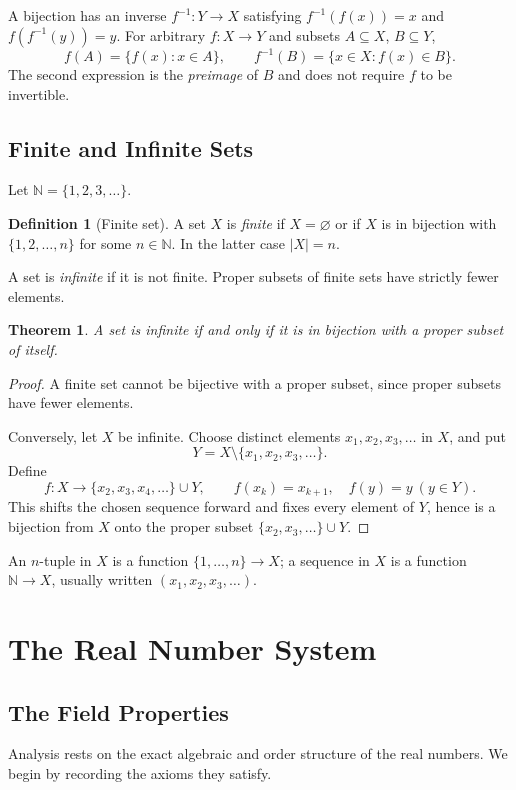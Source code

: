 \documentclass{article}
\theoremstyle{definition}
\newtheorem{definition}{Definition}[section]
\theoremstyle{plain}
\newtheorem{theorem}{Theorem}[section]
\begin{document}
A bijection has an inverse $f^{-1}:Y\to X$ satisfying $f^{-1}(f(x))=x$ and $f(f^{-1}(y))=y$.  For arbitrary $f:X\to Y$ and subsets $A\subseteq X$, $B\subseteq Y$,
\[
	f(A)=\{f(x):x\in A\},
	\qquad
	f^{-1}(B)=\{x\in X:f(x)\in B\}.
\]
The second expression is the \emph{preimage} of $B$ and does not require $f$ to be invertible.

\subsection{Finite and Infinite Sets}\label{subsec:finite-infinite}
Let $\mathbb N=\{1,2,3,\dots\}$.

\begin{definition}[Finite set]\label{def:finite-set}
A set $X$ is \emph{finite} if $X=\varnothing$ or if $X$ is in bijection with $\{1,2,\dots,n\}$ for some $n\in\mathbb N$.  In the latter case $|X|=n$.
\end{definition}

A set is \emph{infinite} if it is not finite.  Proper subsets of finite sets have strictly fewer elements.

\begin{theorem}\label{thm:infinite-bijection}
A set is infinite if and only if it is in bijection with a proper subset of itself.
\end{theorem}

\begin{proof}
A finite set cannot be bijective with a proper subset, since proper subsets have fewer elements.

Conversely, let $X$ be infinite.  Choose distinct elements $x_1,x_2,x_3,\dots$ in $X$, and put
\[
	Y=X\setminus\{x_1,x_2,x_3,\dots\}.
\]
Define
\[
	f:X\to \{x_2,x_3,x_4,\dots\}\cup Y,
	\qquad
	f(x_k)=x_{k+1},\quad f(y)=y\ (y\in Y).
\]
This shifts the chosen sequence forward and fixes every element of $Y$, hence is a bijection from $X$ onto the proper subset $\{x_2,x_3,\dots\}\cup Y$.
\end{proof}

An $n$-tuple in $X$ is a function $\{1,\dots,n\}\to X$; a sequence in $X$ is a function $\mathbb N\to X$, usually written $(x_1,x_2,x_3,\dots)$.

\section{The Real Number System}\label{sec:real-numbers}
	\subsection{The Field Properties}\label{subsec:field-properties}
	Analysis rests on the exact algebraic and order structure of the real numbers. We begin by recording the axioms they satisfy.
\end{document}
